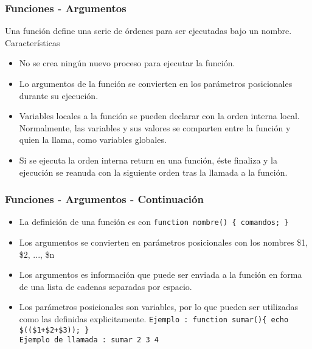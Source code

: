\documentclass{beamer}
\begin{document}
\begin{frame}
\frametitle{Funciones - Argumentos}
       Una  función define una serie de órdenes para ser ejecutadas bajo un nombre. Características

\begin{itemize}
\item No  se crea ningún nuevo proceso para ejecutar la función.
\item Lo argumentos de  la  función  se
       convierten  en los parámetros posicionales durante su ejecución.
\item 
       Variables  locales  a la función se pueden declarar con la orden interna local.  
Normalmente, las
       variables y sus valores se comparten entre la función y quien la llama, como variables globales.

\item
       Si se ejecuta la orden interna return en una función, éste finaliza y la ejecución se reanuda con
       la  siguiente  orden tras la llamada a la función. 

\end{itemize}
\end{frame}

\begin{frame}
\frametitle{Funciones - Argumentos - Continuación}
\begin{itemize}
\item La definición de una función es con \texttt{function nombre() \{ comandos; \} }
\item Los argumentos se convierten en parámetros posicionales con los nombres \$1, \$2, ..., \$n
\item Los argumentos es información que puede ser enviada a la función en forma de una lista de cadenas separadas por espacio.\\ 
\item Los parámetros posicionales son variables, por lo que pueden ser utilizadas como las definidas explicitamente.
\texttt{Ejemplo : function sumar()\{ echo \$((\$1+\$2+\$3)); \} }\\ 
\texttt{Ejemplo de llamada : sumar 2 3 4 }
\end{itemize}
\end{frame}
\end{document}
